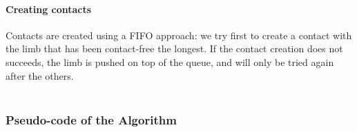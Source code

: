 \documentclass[journal]{IEEEtran}
\begin{document}
\paragraph{Creating contacts}
Contacts are created using a FIFO approach: we try first to create a contact with the limb that has been contact-free the longest. If the contact creation does not succeeds, the limb is pushed on top of the queue, and will only be tried again after the others. \\ \\



\subsubsection{Pseudo-code of the Algorithm}
\label{app:contact}


\end{document}
